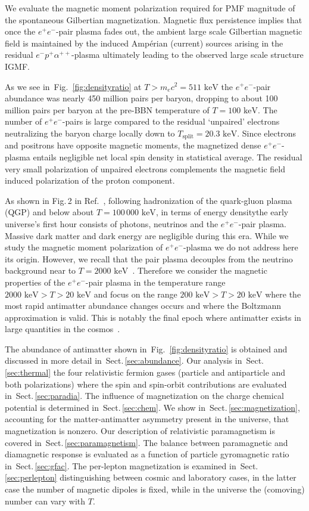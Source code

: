\documentclass[aps,prd,floatfix,reprint]{revtex4-2}
\newcommand*{\keV}{\text{ keV}}
\newcommand{\rf}[1]{Fig.~{\ref{#1}}}
\newcommand{\rsec}[1]{Sect.\,{\ref{#1}}}
\begin{document}
We evaluate the magnetic moment polarization required for PMF magnitude of the spontaneous Gilbertian magnetization. Magnetic flux persistence implies that once the $e^{+}e^{-}$-pair plasma fades out, the ambient large scale Gilbertian magnetic field is maintained by the induced Amp\'erian (current) sources arising in the residual $e^{-}p^{+}\alpha^{++}$-plasma ultimately leading to the observed large scale structure IGMF. 

As we see in~\rf{fig:densityratio} at $T>m_ec^2=511\keV$ the $e^{+}e^{-}$-pair abundance was nearly 450 million pairs per baryon, dropping to about 100 million pairs per baryon at the pre-BBN temperature of $T=100\keV$. The number of $e^{+}e^{-}$-pairs is large compared to the residual `unpaired' electrons neutralizing the baryon charge locally down to $T_\mathrm{split}=20.3\keV$. Since electrons and positrons have opposite magnetic moments, the magnetized dense $e^{+}e^{-}$-plasma entails negligible net local spin density in statistical average. The residual very small polarization of unpaired electrons complements the magnetic field induced polarization of the proton component. 

As shown in Fig.\,2 in Ref.~\cite{Rafelski:2023emw}, following hadronization of the quark-gluon plasma (QGP) and below about $T\!=\!100\,000\keV$, in terms of energy densitythe early universe's first hour consists of photons, neutrinos and the $e^{+}e^{-}$-pair plasma. Massive dark matter and dark energy are negligible during this era. While we study the magnetic moment polarization of $e^{+}e^{-}$-plasma we do not address here its origin. However, we recall that the pair plasma decouples from the neutrino background near to $T=2000\keV$~\cite{Birrell:2014uka}. Therefore we consider the magnetic properties of the $e^{+}e^{-}$-pair plasma in the temperature range $2000\keV>T>20\keV$ and focus on the range $200\keV>T>20\keV$ where the most rapid antimatter abundance changes occurs and where the Boltzmann approximation is valid. This is notably the final epoch where antimatter exists in large quantities in the cosmos~\cite{Rafelski:2023emw}. 

The abundance of antimatter shown in~\rf{fig:densityratio} is obtained and discussed in more detail in~\rsec{sec:abundance}. Our analysis in~\rsec{sec:thermal} the four relativistic fermion gases (particle and antiparticle and both polarizations) where the spin and spin-orbit contributions are evaluated in~\rsec{sec:paradia}. The influence of magnetization on the charge chemical potential is determined in~\rsec{sec:chem}.  We show in~\rsec{sec:magnetization}, accounting for the matter-antimatter asymmetry present in the universe, that magnetization is nonzero. Our description of relativistic paramagnetism is covered in~\rsec{sec:paramagnetism}. The balance between paramagnetic and diamagnetic response is evaluated as a function of particle gyromagnetic ratio in~\rsec{sec:gfac}. The per-lepton magnetization is examined in~\rsec{sec:perlepton} distinguishing between cosmic and laboratory cases, in the latter case the number of magnetic dipoles is fixed, while in the universe the (comoving) number can  vary  with $T$. 
\end{document}
